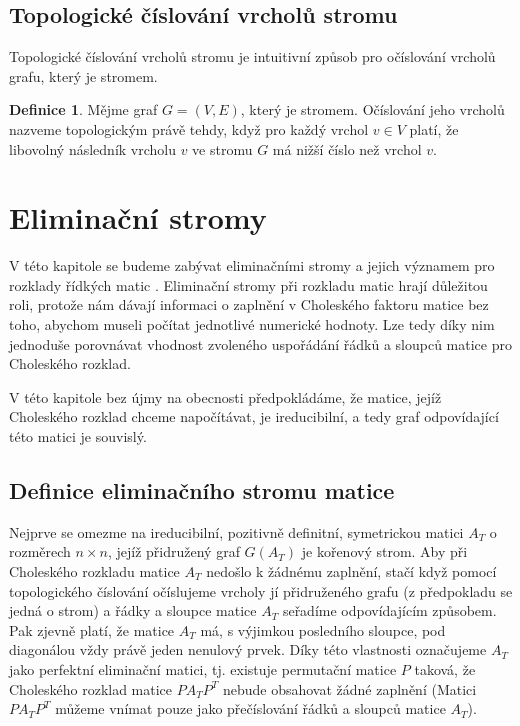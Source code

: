 \documentclass[11pt,american,czech,oneside]{book}
\theoremstyle{plain}
\theoremstyle{definition}
\newtheorem{definition}{Definice}
\begin{document}
\subsection{Topologické číslování vrcholů stromu}
Topologické číslování vrcholů stromu je intuitivní způsob pro očíslování vrcholů grafu, který je stromem.
\begin{definition}
    Mějme graf $G = (V,E)$, který je stromem. Očíslování jeho vrcholů nazveme topologickým právě tehdy,
    když pro každý vrchol $v \in V$ platí, že libovolný následník vrcholu $v$ ve stromu $G$ má nižší číslo než vrchol $v$.
\end{definition}


\section{Eliminační stromy}
\label{eltreeChapter}

V této kapitole se budeme zabývat eliminačními stromy a jejich významem pro rozklady řídkých matic \cite{liu:86,liu:90}. Eliminační stromy při rozkladu matic hrají důležitou roli, protože nám dávají informaci o zaplnění v Choleského faktoru matice bez toho, abychom museli počítat jednotlivé numerické hodnoty. Lze tedy díky nim jednoduše porovnávat vhodnost zvoleného uspořádání řádků a sloupců matice pro Choleského rozklad.

V této kapitole bez újmy na obecnosti předpokládáme, že matice, jejíž Choleského rozklad chceme napočítávat, je ireducibilní, a tedy graf odpovídající této matici je souvislý.

\subsection{Definice eliminačního stromu matice}

Nejprve se omezme na ireducibilní, pozitivně definitní, symetrickou matici $A_T$ o rozměrech $n \times n$, jejíž přidružený graf $G(A_T)$ je kořenový strom. Aby při Choleského rozkladu matice $A_T$ nedošlo k žádnému zaplnění, stačí když pomocí topologického číslování očíslujeme vrcholy jí přidruženého grafu (z předpokladu se jedná o strom) a řádky a sloupce matice $A_T$ seřadíme odpovídajícím způsobem. Pak zjevně platí, že matice $A_T$ má, s výjimkou posledního sloupce, pod diagonálou vždy právě jeden nenulový prvek. Díky této vlastnosti označujeme $A_T$ jako perfektní eliminační matici, tj. existuje permutační matice $P$ taková, že Choleského rozklad matice $PA_TP^T$ nebude obsahovat žádné zaplnění \cite{rose:72} (Matici $PA_TP^T$ můžeme vnímat pouze jako přečíslování řádků a sloupců matice $A_T$). 
\end{document}
